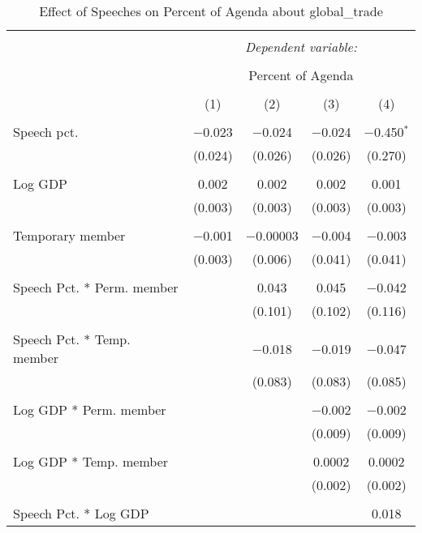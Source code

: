 
\begin{table}[!htbp] \centering 
  \caption{Effect of Speeches on Percent of Agenda about  global_trade} 
  \label{} 
\begin{tabular}{@{\extracolsep{5pt}}lcccc} 
\\[-1.8ex]\hline 
\hline \\[-1.8ex] 
 & \multicolumn{4}{c}{\textit{Dependent variable:}} \\ 
\cline{2-5} 
\\[-1.8ex] & \multicolumn{4}{c}{Percent of Agenda} \\ 
\\[-1.8ex] & (1) & (2) & (3) & (4)\\ 
\hline \\[-1.8ex] 
 Speech pct. & $-$0.023 & $-$0.024 & $-$0.024 & $-$0.450$^{*}$ \\ 
  & (0.024) & (0.026) & (0.026) & (0.270) \\ 
  & & & & \\ 
 Log GDP & 0.002 & 0.002 & 0.002 & 0.001 \\ 
  & (0.003) & (0.003) & (0.003) & (0.003) \\ 
  & & & & \\ 
 Temporary member & $-$0.001 & $-$0.00003 & $-$0.004 & $-$0.003 \\ 
  & (0.003) & (0.006) & (0.041) & (0.041) \\ 
  & & & & \\ 
 Speech Pct. * Perm. member &  & 0.043 & 0.045 & $-$0.042 \\ 
  &  & (0.101) & (0.102) & (0.116) \\ 
  & & & & \\ 
 Speech Pct. * Temp. member &  & $-$0.018 & $-$0.019 & $-$0.047 \\ 
  &  & (0.083) & (0.083) & (0.085) \\ 
  & & & & \\ 
 Log GDP * Perm. member &  &  & $-$0.002 & $-$0.002 \\ 
  &  &  & (0.009) & (0.009) \\ 
  & & & & \\ 
 Log GDP * Temp. member &  &  & 0.0002 & 0.0002 \\ 
  &  &  & (0.002) & (0.002) \\ 
  & & & & \\ 
 Speech Pct. * Log GDP &  &  &  & 0.018 \\ 

\end{tabular}
\end{table}
